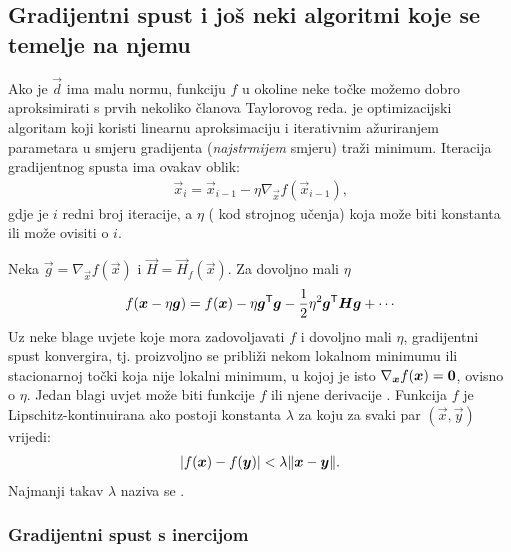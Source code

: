 \documentclass[utf8, diplomski, lmodern]{fer}
\begin{document}
\subsection{Gradijentni spust i još neki algoritmi koje se temelje na njemu} \label{subsec:gradijenti-spust}

Ako je $\vec d$ ima malu normu, funkciju $f$ u okoline neke točke možemo dobro aproksimirati s prvih nekoliko članova Taylorovog reda.  je optimizacijski algoritam koji koristi linearnu aproksimaciju i iterativnim ažuriranjem parametara u smjeru gradijenta (\textit{najstrmijem} smjeru) traži minimum. Iteracija gradijentnog spusta ima ovakav oblik:
\begin{align} \label{eq:gs}
\vec x_i = \vec x_{i-1} - \eta\nabla_{\vec x}f(\vec x_{i-1}) \text{,}
\end{align}
gdje je $i$ redni broj iteracije, a $\eta$  ( kod strojnog učenja) koja može biti konstanta ili može ovisiti o $i$.

Neka $\vec g=\nabla_{\vec x}f(\vec x)$ i $\vec H=\vec H_f(\vec x)$. Za dovoljno mali $\eta$
\begin{align} \label{eq:grad-delta-approx}
f(\vec x-\eta\vec g) = f(\vec x) - \eta\vec g^\tp\vec g - \frac{1}{2}\eta^2\vec g^\tp\vec H\vec g + \cdots
\end{align}
Uz neke blage uvjete koje mora zadovoljavati $f$ i dovoljno mali $\eta$, gradijentni spust konvergira, tj. proizvoljno se približi nekom lokalnom minimumu ili stacionarnoj točki koja nije lokalni minimum, u kojoj je isto $\nabla_{\vec x}f(\vec x)=\cvec 0$, ovisno o $\eta$. Jedan blagi uvjet može biti  funkcije $f$ ili njene derivacije \citep{Goodfellow:2016:DL}. Funkcija $f$ je Lipschitz-kontinuirana ako postoji konstanta $\lambda$ za koju za svaki par $(\vec x,\vec y)$ vrijedi:
\begin{align}
\envert{f(\vec x)-f(\vec y)} < \lambda\enVert{\vec x-\vec y} \text{.}
\end{align}
Najmanji takav $\lambda$ naziva se .

\subsubsection{Gradijentni spust s inercijom}
\end{document}

